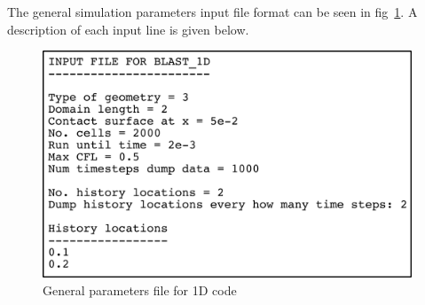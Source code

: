 \documentclass[pdftex, 12pt, a4paper]{report}
\begin{document}
The general simulation parameters input file format can be seen in fig~\ref{fig:b1d.par}.  A description of each input line is
given below.

\newpage

\begin{figure}[htp]
\centering
\includegraphics[width=11cm]{pics/b1d_par_template.jpg}
\caption{General parameters file for 1D code}
\label{fig:b1d.par}
\end{figure}
\end{document}
